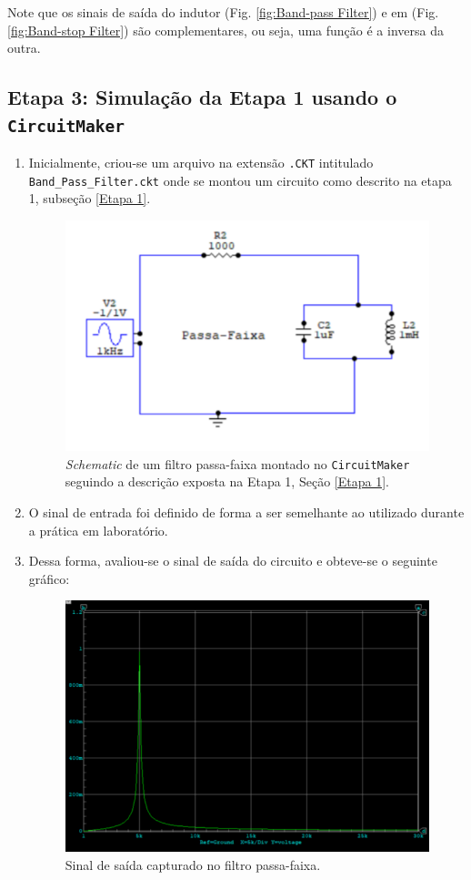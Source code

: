 \documentclass[letterpaper, 12pt]{article}
\begin{document}
\begin{enumerate}
    Note que os sinais de saída do indutor (Fig. \ref{fig:Band-pass Filter}) e em (Fig. \ref{fig:Band-stop Filter}) são complementares, ou seja, uma função é a inversa da outra.
\end{enumerate}


\subsection{Etapa 3: Simulação da Etapa 1 usando o \texttt{CircuitMaker}}
\begin{enumerate}
    \item Inicialmente, criou-se um arquivo na extensão \texttt{.CKT} intitulado \texttt{Band\_Pass\_Filter.ckt} onde se montou um circuito como descrito na etapa 1, subseção \ref{Etapa 1}.
    
    \begin{figure}[h]
        \centering
        \includegraphics[width=0.5\linewidth]{figures/Band_pass_schematic.png}
        \caption{{\it Schematic} de um filtro passa-faixa montado no \texttt{CircuitMaker} seguindo a descrição exposta na Etapa 1, Seção \ref{Etapa 1}.}
        \label{Low_pass}
    \end{figure}
    
    \item O sinal de entrada foi definido de forma a ser semelhante ao utilizado durante a prática em laboratório.
    
    \item Dessa forma, avaliou-se o sinal de saída do circuito e obteve-se o seguinte gráfico:
    \begin{figure}[h]
        \centering
        \includegraphics[width=0.5\linewidth]{figures/Band_pass_Graph.png}
        \caption{Sinal de saída capturado no filtro passa-faixa.}
        \label{fig:Band_pass}
    \end{figure}
\end{enumerate}
\end{document}
